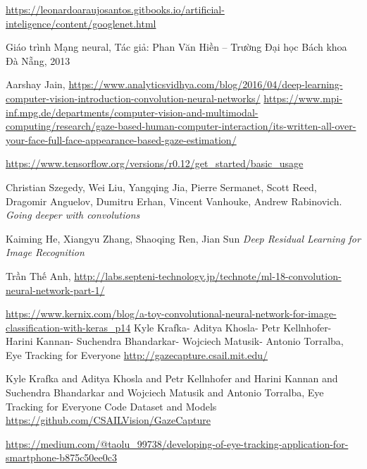 \documentclass[12pt,a4paper,oneside]{book} %
\begin{document}
\begin{thebibliography}{99}
	\url{https://leonardoaraujosantos.gitbooks.io/artificial-inteligence/content/googlenet.html}

	Giáo trình Mạng neural, Tác giả: Phan Văn Hiền – Trường Đại học Bách khoa Đà Nẵng, 2013

	 Aarshay Jain,
	\url{https://www.analyticsvidhya.com/blog/2016/04/deep-learning-computer-vision-introduction-convolution-neural-networks/}
	\url{https://www.mpi-inf.mpg.de/departments/computer-vision-and-multimodal-computing/research/gaze-based-human-computer-interaction/its-written-all-over-your-face-full-face-appearance-based-gaze-estimation/}

	\bibitem{}
	\url{https://www.tensorflow.org/versions/r0.12/get_started/basic_usage}

	Christian Szegedy, Wei Liu, Yangqing Jia, Pierre Sermanet, Scott Reed, Dragomir Anguelov, Dumitru Erhan, Vincent Vanhouke, Andrew Rabinovich. \textit{Going deeper with convolutions}

	Kaiming He, Xiangyu Zhang, Shaoqing Ren, Jian Sun \textit{Deep Residual Learning for Image Recognition}

	 Trần Thế Anh,
	\url{http://labs.septeni-technology.jp/technote/ml-18-convolution-neural-network-part-1/}

	\url{https://www.kernix.com/blog/a-toy-convolutional-neural-network-for-image-classification-with-keras_p14}
	Kyle Krafka- Aditya Khosla- Petr Kellnhofer- Harini Kannan- Suchendra Bhandarkar- Wojciech Matusik- Antonio Torralba, Eye Tracking for Everyone
	\url{http://gazecapture.csail.mit.edu/}

	Kyle Krafka and Aditya Khosla and Petr Kellnhofer and Harini Kannan and Suchendra Bhandarkar and Wojciech Matusik and Antonio Torralba, Eye Tracking for Everyone Code Dataset and Models
	\url{https://github.com/CSAILVision/GazeCapture}

	\url{https://medium.com/@taolu_99738/developing-of-eye-tracking-application-for-smartphone-b875c50ee0c3}

\end{thebibliography}
\end{document}
